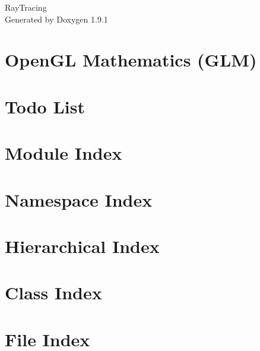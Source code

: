 \let\mypdfximage\pdfximage\def\pdfximage{\immediate\mypdfximage}\documentclass[twoside]{book}
\newcommand{\+}{\discretionary{\mbox{\scriptsize$\hookleftarrow$}}{}{}}
\newcommand{\clearemptydoublepage}{%
  \newpage{\pagestyle{empty}\cleardoublepage}%
}
\begin{document}
\raggedbottom

\hypersetup{pageanchor=false,
             bookmarksnumbered=true,
             pdfencoding=unicode
            }
\begin{titlepage}
\vspace*{7cm}
\begin{center}%
{\Large Ray\+Tracing }\\
\vspace*{1cm}
{\large Generated by Doxygen 1.9.1}\\
\end{center}
\end{titlepage}
\clearemptydoublepage
{}
\tableofcontents
\clearemptydoublepage
{}
\hypersetup{pageanchor=true}

\chapter{Open\+GL Mathematics (GLM)}
\label{index}\hypertarget{index}{}
\chapter{Todo List}
\label{todo}

\chapter{Module Index}

\chapter{Namespace Index}

\chapter{Hierarchical Index}

\chapter{Class Index}

\chapter{File Index}

\end{document}
